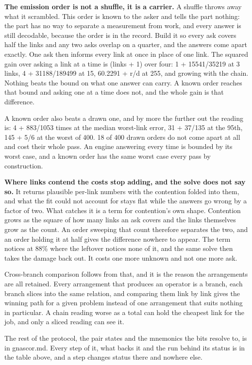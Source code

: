 \textbf{The emission order is not a shuffle, it is a carrier.} A shuffle throws away what it scrambled. This order is known to the asker and tells the part nothing: the part has no way to separate a measurement from work, and every answer is still decodable, because the order is in the record. Build it so every ask covers half the links and any two asks overlap on a quarter, and the answers come apart exactly. One ask then informs every link at once in place of one link. The squared gain over asking a link at a time is (links + 1) over four: 1 + 15541/35219 at 3 links, 4 + 31188/189499 at 15, 60.2291 + r/d at 255, and growing with the chain. Nothing beats the bound on what one answer can carry. A known order reaches that bound and asking one at a time does not, and the whole gain is that difference.

A known order also beats a drawn one, and by more the further out the reading is: 4 + 883/1053 times at the median worst-link error, 31 + 37/135 at the 95th, 145 + 5/6 at the worst of 400. 18 of 400 drawn orders do not come apart at all and cost their whole pass. An engine answering every time is bounded by its worst case, and a known order has the same worst case every pass by construction.

\textbf{Where links contend the costs stop adding, and the solve does not say so.} It returns plausible per-link numbers with the contention folded into them, and what the fit could not account for stays flat while the answers go wrong by a factor of two. What catches it is a term for contention's own shape. Contention grows as the square of how many links an ask covers and the links themselves grow as the count. An order sweeping that count therefore separates the two, and an order holding it at half gives the difference nowhere to appear. The term notices at 88\% where the leftover notices none of it, and the same solve then takes the damage back out. It costs one more unknown and not one more ask.

Cross-branch comparison follows from that, and it is the reason the arrangements are all retained. Every arrangement that produces an operator is a branch, each branch slices into the same relation, and comparing them link by link gives the winning path for a given problem instead of one arrangement that suits nothing in particular. A chain reading worse as a total can hold the cheapest link for the job, and only a sliced reading can see it.

The rest of the protocol, the pair states and the mnemonics the bits resolve to, is in gnascor.md. Every step of it, what backs it and the run behind its status is in the table above, and a step changes status there and nowhere else.

